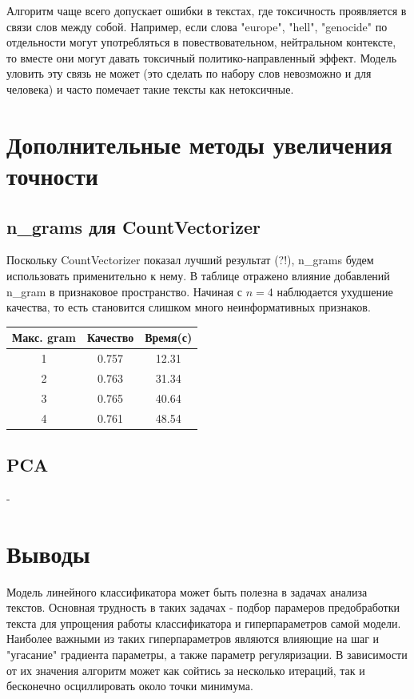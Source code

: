 \documentclass{article}
\begin{document}
            Алгоритм чаще всего допускает ошибки в текстах, где токсичность проявляется в связи слов между собой. Например, если слова "europe", "hell", "genocide" по отдельности могут употребляться в повествовательном, нейтральном контексте, то вместе они могут давать токсичный политико-направленный эффект. Модель уловить эту связь не может (это сделать по набору слов невозможно и для человека) и часто помечает такие тексты как нетоксичные.

    \section{Дополнительные методы увеличения точности}
        \subsection{n\_grams для CountVectorizer}
            Поскольку CountVectorizer показал лучший результат (?!), n\_grams будем использовать применительно к нему. В таблице отражено влияние добавлений n\_gram в признаковое пространство. Начиная с $n=4$ наблюдается ухудшение качества, то есть становится слишком много неинформативных признаков.
            \begin{center}
                \begin{tabular}{| c | c | c |}
                    \hline
                    Макс. gram & Качество & Время(с) \\
                    \hline
                    1 & 0.757 & 12.31 \\
                    \hline
                    2 & 0.763 & 31.34 \\
                    \hline
                    3 & 0.765 & 40.64 \\
                    \hline
                    4 & 0.761 & 48.54 \\
                    \hline
                \end{tabular}
            \end{center}
        \subsection{PCA}
            -

    \section{Выводы}
            Модель линейного классификатора может быть полезна в задачах анализа текстов. Основная трудность в таких задачах - подбор парамеров предобработки текста для упрощения работы классификатора и гиперпараметров самой модели. Наиболее важными из таких гиперпараметров являются влияющие на шаг и "угасание" градиента параметры, а также параметр регуляризации. В зависимости от их значения алгоритм может как сойтись за несколько итераций, так и бесконечно осциллировать около точки минимума.
\end{document}
